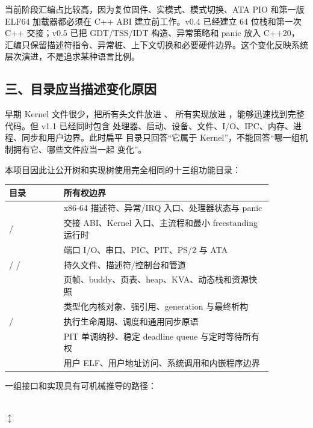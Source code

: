 当前阶段汇编占比较高，因为复位固件、实模式、模式切换、ATA PIO 和第一版
ELF64 加载器都必须在 C++ ABI 建立前工作。v0.4 已经建立 64 位栈和第一次
C++ 交接；v0.5 已把 GDT/TSS/IDT 构造、异常策略和 panic 放入 C++20，
汇编只保留描述符指令、异常桩、上下文切换和必要硬件边界。这个变化反映系统
层次演进，不是追求某种语言比例。

\subsection{三、目录应当描述变化原因}

早期 Kernel 文件很少，把所有头文件放进 、
所有实现放进 ，能够迅速找到完整代码。但 v1.1 已经同时包含
处理器、启动、设备、文件、I/O、IPC、内存、进程、同步和用户边界。此时扁平
目录只回答“它属于 Kernel”，不能回答“哪一组机制拥有它、哪些文件应当一起
变化”。

本项目因此让公开树和实现树使用完全相同的十三组功能目录：

\begin{longtable}{L{0.18\linewidth}L{0.69\linewidth}}
\toprule
目录 & 所有权边界 \\
\midrule
{} & x86-64 描述符、异常/IRQ 入口、处理器状态与 panic \\
 /  & 交接 ABI、Kernel 入口、主流程和最小 freestanding 运行时 \\
 & 端口 I/O、串口、PIC、PIT、PS/2 与 ATA \\
 /  /  & 持久文件、描述符/控制台和管道 \\
 & 页帧、buddy、页表、heap、KVA、动态栈和资源快照 \\
 & 类型化内核对象、强引用、generation 与最终析构 \\
 /  & 执行生命周期、调度和通用同步原语 \\
 & PIT 单调纳秒、稳定 deadline queue 与定时等待所有权 \\
 & 用户 ELF、用户地址访问、系统调用和内嵌程序边界 \\
\bottomrule
\end{longtable}

一组接口和实现具有可机械推导的路径：

\begin{center}
\\
\(\updownarrow\)\\
\end{center}


